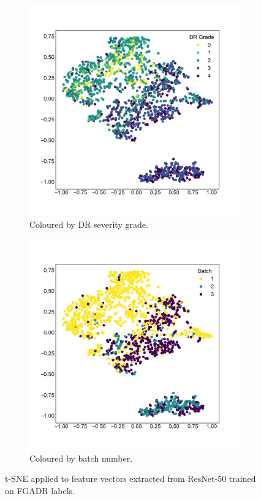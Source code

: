\begin{figure}[h]
    \centering
    \begin{subfigure}{0.45\textwidth}
        \centering
        \includegraphics[width=\linewidth]{datasets/figs/fgadr_label_tsne.pdf}
        \caption{Coloured by DR severity grade.}
        \label{fig:fgadr_tsne_grade}
    \end{subfigure} %
    \begin{subfigure}{0.45\textwidth}
        \centering
        \includegraphics[width=\linewidth]{datasets/figs/fgadr_batch_tsne.pdf}
        \caption{Coloured by batch number.}
        \label{fig:fgadr_tnse_grader}
    \end{subfigure}
    \caption{t-SNE applied to feature vectors extracted from ResNet-50 trained on FGADR labels.}
    \label{fig:fgadr_tsne}
\end{figure}

